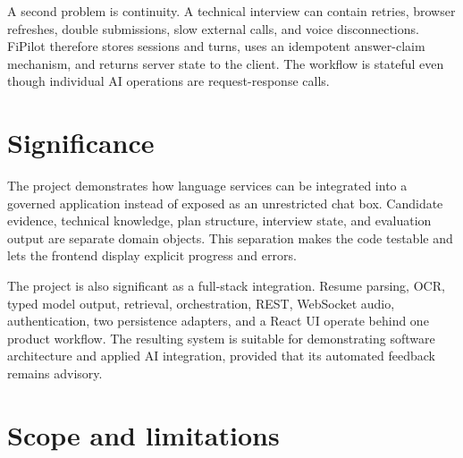 A second problem is continuity. A technical interview can contain retries, browser refreshes, double submissions, slow external calls, and voice disconnections. FiPilot therefore stores sessions and turns, uses an idempotent answer-claim mechanism, and returns server state to the client. The workflow is stateful even though individual AI operations are request-response calls.


\section{Significance}

The project demonstrates how language services can be integrated into a governed application instead of exposed as an unrestricted chat box. Candidate evidence, technical knowledge, plan structure, interview state, and evaluation output are separate domain objects. This separation makes the code testable and lets the frontend display explicit progress and errors.

The project is also significant as a full-stack integration. Resume parsing, OCR, typed model output, retrieval, orchestration, REST, WebSocket audio, authentication, two persistence adapters, and a React UI operate behind one product workflow. The resulting system is suitable for demonstrating software architecture and applied AI integration, provided that its automated feedback remains advisory.

\section{Scope and limitations}

